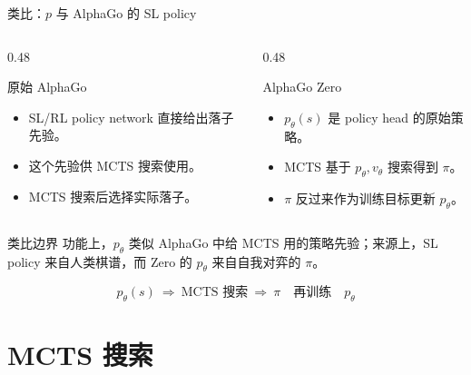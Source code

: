 \documentclass[UTF8,aspectratio=169,10pt]{ctexbeamer}
\begin{document}
\begin{frame}{类比：$p$ 与 AlphaGo 的 SL policy}
  \small
  \begin{columns}[T,onlytextwidth]
    \begin{column}{0.48\textwidth}
      \begin{block}{原始 AlphaGo}
        \begin{itemize}
          \item SL/RL policy network 直接给出落子先验。
          \item 这个先验供 MCTS 搜索使用。
          \item MCTS 搜索后选择实际落子。
        \end{itemize}
      \end{block}
    \end{column}
    \begin{column}{0.48\textwidth}
      \begin{block}{AlphaGo Zero}
        \begin{itemize}
          \item $p_{\theta}(s)$ 是 policy head 的原始策略。
          \item MCTS 基于 $p_{\theta},v_{\theta}$ 搜索得到 $\pi$。
          \item $\pi$ 反过来作为训练目标更新 $p_{\theta}$。
        \end{itemize}
      \end{block}
    \end{column}
  \end{columns}

  \begin{alertblock}{类比边界}
    功能上，$p_{\theta}$ 类似 AlphaGo 中给 MCTS 用的策略先验；来源上，SL policy 来自人类棋谱，而 Zero 的 $p_{\theta}$ 来自自我对弈的 $\pi$。
  \end{alertblock}

  \[
    p_{\theta}(s)\ \Longrightarrow\ \text{MCTS 搜索}\ \Longrightarrow\ \pi
    \quad\text{再训练}\quad p_{\theta}
  \]
\end{frame}

\section{MCTS 搜索}
\end{document}
